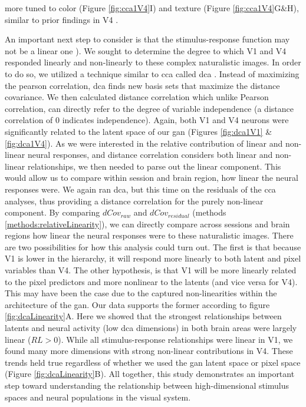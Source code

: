 more tuned to color (Figure \ref{fig:cca1V4}I) and texture (Figure \ref{fig:cca1V4}G\&H), similar to prior findings in V4 \parencite{Nigam2021, Kim2019}.

An important next step to consider is that the stimulus-response function may not be a linear one \parencite{Prenger2004, Touryan2015}). We sought to determine the degree to which V1 and V4 responded linearly and non-linearly to these complex naturalistic images. In order to do so, we utilized a technique similar to \gls{cca} called \gls{dca} \parencite{Cowley2017}. Instead of maximizing the pearson correlation, \gls{dca} finds new basis sets that maximize the distance covariance. We then calculated distance correlation which unlike Pearson correlation, can directly refer to the degree of variable independence (a distance correlation of 0 indicates independence). Again, both V1 and V4 neurons were significantly related to the latent space of our \gls{gan} (Figures \ref{fig:dca1V1} \& \ref{fig:dca1V4}). As we were interested in the relative contribution of linear and non-linear neural responses, and distance correlation considers both linear and non-linear relationships, we then needed to parse out the linear component. This would allow us to compare within session and brain region, how linear the neural responses were. We again ran \gls{dca}, but this time on the residuals of the \gls{cca} analyses, thus providing a distance correlation for the purely non-linear component. By comparing $dCov_{raw}$ and $dCov_{residual}$ (methods \ref{methods:relativeLinearity}), we can directly compare across sessions and brain regions how linear the neural responses were to these naturalistic images. There are two possibilities for how this analysis could turn out. The first is that because V1 is lower in the hierarchy, it will respond more linearly to both latent and pixel variables than V4. The other hypothesis, is that V1 will be more linearly related to the pixel predictors and more nonlinear to the latents (and vice versa for V4). This may have been the case due to the captured non-linearities within the architecture of the \gls{gan}. Our data supports the former according to figure \ref{fig:dcaLinearity}A. Here we showed that the strongest relationships between latents and neural activity (low \gls{dca} dimensions) in both brain areas were largely linear ($RL>0$). While all stimulus-response relationships were linear in V1, we found many more dimensions with strong non-linear contributions in V4. These trends held true regardless of whether we used the \gls{gan} latent space or pixel space (Figure \ref{fig:dcaLinearity}B). All together, this study demonstrates an important step toward understanding the relationship between high-dimensional stimulus spaces and neural populations in the visual system. 


